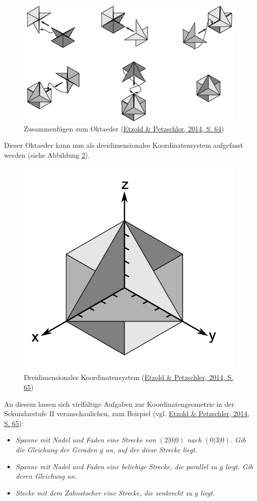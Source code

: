 \documentclass[
]{scrbook}
\theoremstyle{definition}
\theoremstyle{definition}
\theoremstyle{definition}
\theoremstyle{definition}
\theoremstyle{remark}
\begin{document}
\begin{figure}

{\centering \includegraphics[width=0.75\linewidth]{pictures/12-3DKos2} 

}

\caption{Zusammenfügen zum Oktaeder (\protect\hyperlink{ref-Etzold2014a}{Etzold \& Petzschler, 2014, S. 64})}\label{fig:3DKos2}
\end{figure}

Dieser Oktaeder kann nun als dreidimensionales Koordinatensystem aufgefasst werden (siehe Abbildung \ref{fig:3DKos3}).



\begin{figure}

{\centering \includegraphics[width=0.5\linewidth]{pictures/12-3DKos3} 

}

\caption{Dreidimensionales Koordinatensystem (\protect\hyperlink{ref-Etzold2014a}{Etzold \& Petzschler, 2014, S. 65})}\label{fig:3DKos3}
\end{figure}

An diesem lassen sich vielfältige Aufgaben zur Koordinatengeometrie in der Sekundarstufe II veranschaulichen, zum Beispiel (vgl. \protect\hyperlink{ref-Etzold2014a}{Etzold \& Petzschler, 2014, S. 65}):

\begin{itemize}
\item
  \emph{Spanne mit Nadel und Faden eine Strecke von \((2|0|0)\) nach \((0|3|0)\). Gib die Gleichung der Geraden \(g\) an, auf der diese Strecke liegt.}
\item
  \emph{Spanne mit Nadel und Faden eine beliebige Strecke, die parallel zu \(g\) liegt. Gib deren Gleichung an.}
\item
  \emph{Stecke mit dem Zahnstocher eine Strecke, die senkrecht zu \(g\) liegt.}
\end{itemize}
\end{document}
